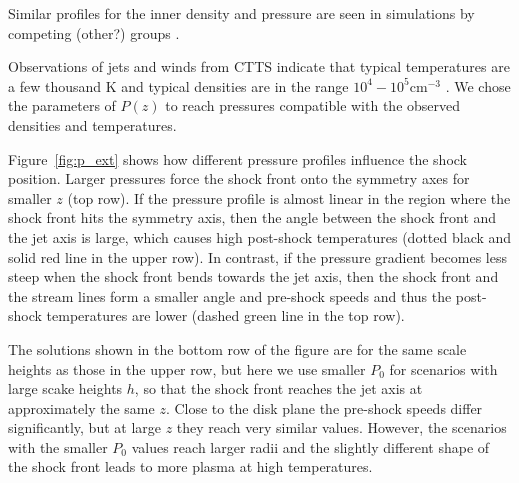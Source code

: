 Similar profiles for the inner density and pressure are seen in simulations by competing (other?) groups \citep[e.g.]{2005ApJ...630..945A,Li_Krasnopolsky_Blandford_2006,2008ApJ...678.1109M}.

Observations of jets and winds from CTTS indicate that typical temperatures are a few thousand K and typical densities are in the range $10^4-10^5 \mathrm{ cm}^{-3}$ \citep[e.g.][]{2000A&A...356L..41L,2007ApJ...657..897K}. We chose the parameters of $P(z)$ to reach pressures compatible with the observed densities and temperatures.

Figure~\ref{fig:p_ext} shows how different pressure profiles influence the shock position. 
Larger pressures force the shock front onto the symmetry axes for smaller $z$ (top row). If the pressure profile is almost linear in the region where the shock front hits the symmetry axis, then the angle between the shock front and the jet axis is large, which causes high post-shock temperatures (dotted black and solid red line in the upper row). In contrast, if the pressure gradient becomes less steep when the shock front bends towards the jet axis, then the shock front and the stream lines form a smaller angle and pre-shock speeds and thus the post-shock temperatures are lower (dashed green line in the top row).

The solutions shown in the bottom row of the figure are for the same scale heights as those in the upper row, but here we use smaller $P_0$ for scenarios with large scake heights $h$, so that the shock front reaches the jet axis at approximately the same $z$. Close to the disk plane the pre-shock speeds differ significantly, but at large $z$ they reach very similar values. However, the scenarios with the smaller $P_0$ values reach larger radii and the slightly different shape of the shock front leads to more plasma at high temperatures.